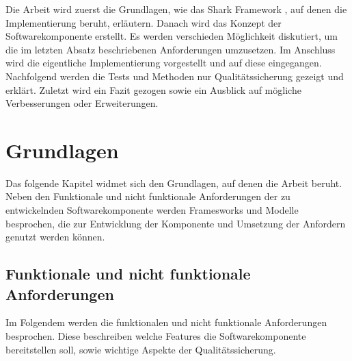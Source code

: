 \documentclass[a4paper]{article}
\begin{document}
	Die Arbeit wird zuerst die Grundlagen, wie das Shark Framework \cite{SharkFW},
	auf denen die Implementierung beruht, erläutern. Danach wird das Konzept
	der Softwarekomponente erstellt. Es werden verschieden Möglichkeit
	diskutiert, um die im letzten Absatz beschriebenen Anforderungen umzusetzen.
	Im Anschluss wird die eigentliche Implementierung vorgestellt und auf
	diese eingegangen. Nachfolgend werden die Tests und Methoden nur
	Qualitätssicherung gezeigt und erklärt. Zuletzt wird ein Fazit gezogen
	sowie ein Ausblick auf mögliche Verbesserungen oder Erweiterungen.

	\newpage
	
	\section{Grundlagen}
	
	Das folgende Kapitel widmet sich den Grundlagen, auf denen die Arbeit
	beruht. Neben den Funktionale und nicht funktionale Anforderungen
	der zu entwickelnden Softwarekomponente werden Framesworks und Modelle
	besprochen, die zur Entwicklung der Komponente und Umsetzung der Anfordern
	genutzt werden können. 
	
	\subsection{Funktionale und nicht funktionale Anforderungen}
	\label{sec:requirements}
	
	Im Folgendem werden die funktionalen und nicht funktionale
	Anforderungen besprochen. Diese	beschreiben welche Features die
	Softwarekomponente bereitstellen soll, sowie wichtige Aspekte der
	Qualitätssicherung.
	
\end{document}
